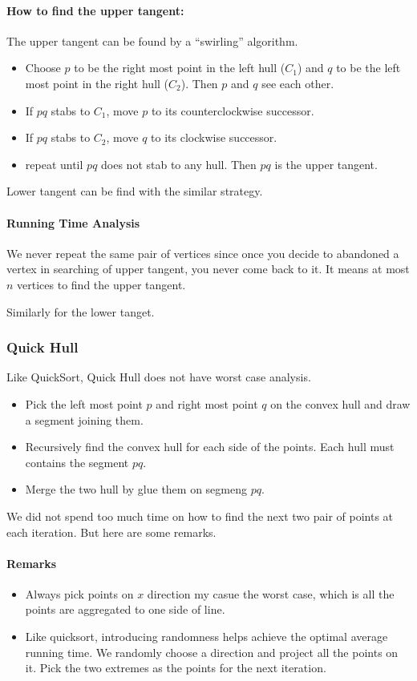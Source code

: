 \documentclass[en,hazy,blue,screen,14pt]{elegantnote}
\begin{document}
\paragraph{How to find the upper tangent:}
The upper tangent can be found by a ``swirling'' algorithm.
\begin{itemize}
\item Choose $p$ to be the right most point in the left hull ($C_1$) and 
$q$ to be the left most point in the right hull ($C_2$). Then $p$ and $q$ see 
each other. 
\item If $pq$ stabs to $C_1$, move $p$ to its counterclockwise successor.
\item If $pq$ stabs to $C_2$, move $q$ to its clockwise successor.
\item repeat until $pq$ does not stab to any hull. Then $pq$ is the upper 
tangent.
\end{itemize}

Lower tangent can be find with the similar strategy.

\paragraph{Running Time Analysis}
We never repeat the same pair of vertices since once you decide to abandoned a 
vertex in searching of upper tangent, you never come back to it. It means at 
most $n$ vertices to find the upper tangent.

Similarly for the lower tanget.

\subsubsection{Quick Hull}
Like QuickSort, Quick Hull does not have worst case analysis.
\begin{itemize}
\item Pick the left most point $p$ and right most point $q$ on the convex hull 
and draw a segment joining them.
\item Recursively find the convex hull for each side of the points. Each hull 
must contains the segment $pq$.
\item Merge the two hull by glue them on segmeng $pq$.
\end{itemize}

We did not spend too much time on how to find the next two pair of points at 
each iteration. But here are some remarks.

\paragraph{Remarks}
\begin{itemize}
 \item Always pick points on $x$ direction my casue the worst case, which is 
all the points are aggregated to one side of line.
\item Like quicksort, introducing randomness helps achieve the optimal average 
running time. We randomly choose a direction and project all the points on it. 
Pick the two extremes as the points for the next iteration.
\end{itemize}
\end{document}
